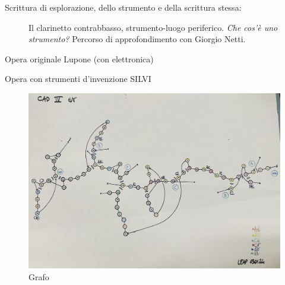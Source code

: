 \documentclass{gs-adonis}
\begin{document}
\begin{description}
  \item[Scrittura di esplorazione, dello strumento e della scrittura stessa:]
  Il clarinetto contrabbasso, strumento-luogo periferico.
  \emph{Che cos'è uno strumento?} Percorso di approfondimento con Giorgio Netti.
\end{description}

Opera originale Lupone (con elettronica)

Opera con strumenti d'invenzione SILVI %


\begin{figure}[ht]
  \centering
  \includegraphics[width=\linewidth]{images/cad-IV-grafo.jpg}
  \captionsetup{width=.81\linewidth}
  \caption{Grafo}
  \label{grafo}
\end{figure}
\end{document}

